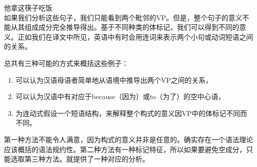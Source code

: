 \begin{exe}
\begin{xlist}[iv.]
\begin{exe}
\begin{xlist}[iv.]
\ex
     他拿这筷子吃饭 \\
\zl
如果我们分析这些句子，我们只能看到两个毗邻的VP。但是，整个句子的意义不能从其组成成分完全推导得出。基于不同种类的体标记，我们可以得到不同的意义。正如我们在译文中所见，英语中有时会用连词来表示两个小句或动词短语之间的关系。

总共有三种可能的方式来概括这些例子：
\begin{enumerate}
\item 可以认为汉语母语者简单地从语境中推导出两个VP之间的关系，
\item 可以认为汉语中有对应于because（因为）或to（为了）的空中心语，
\item 为连动式假设一个短语结构，来解释整个构式的意义因VP中的体标记不同而不同。
\end{enumerate}
第一种方法不能令人满意，因为构式的意义并非是任意的。确实存在一个语法理论应该概括的语法规约性。第二种方法有一种标记特征，所以如果要避免空成分，只能选取第三种方法。\citet{ML2009a}就提供了一种对应的分析。


\end{xlist}
\end{exe}
\end{xlist}
\end{exe}
